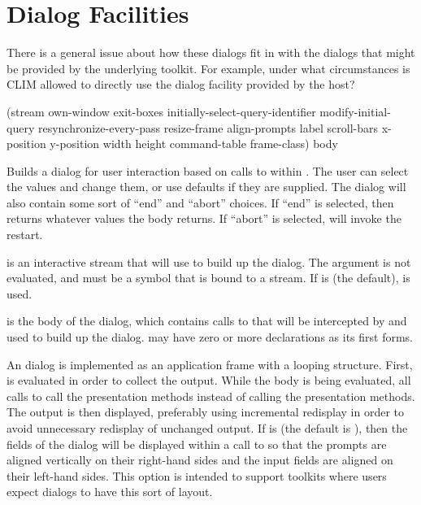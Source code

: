 
\chapter {Dialog Facilities}
\label {dialogs}

 {There is a general issue about how these dialogs fit in with the
dialogs that might be provided by the underlying toolkit.  For example, under
what circumstances is CLIM allowed to directly use the dialog facility provided
by the host?}


 {(\optional stream
                               \key own-window exit-boxes 
                                    initially-select-query-identifier modify-initial-query
                                    resynchronize-every-pass resize-frame
                                    align-prompts label scroll-bars 
                                    x-position y-position width height
                                    command-table frame-class)
                              \body body}

Builds a dialog for user interaction based on calls to  within
. The user can select the values and change them, or use defaults if
they are supplied.  The dialog will also contain some sort of ``end'' and
``abort'' choices.  If ``end'' is selected, then  returns
whatever values the body returns.  If ``abort'' is selected,
 will invoke the  restart.

 is an interactive stream that  will use to
build up the dialog.  The  argument is not evaluated, and must be a
symbol that is bound to a stream.  If  is  (the default),
 is used.

 is the body of the dialog, which contains calls to  that
will be intercepted by  and used to build up the dialog.
 may have zero or more declarations as its first forms.

An  dialog is implemented as an application frame with a
looping structure.  First,  is evaluated in order to collect the
output.  While the body is being evaluated, all calls to  call the
 presentation methods instead of calling the
 presentation methods.  The output is then displayed, preferably
using incremental redisplay in order to avoid unnecessary redisplay of unchanged
output.  If  is  (the default is ), then
the fields of the dialog will be displayed within a call to
 so that the prompts are aligned vertically on their
right-hand sides and the input fields are aligned on their left-hand sides.
This option is intended to support toolkits where users expect dialogs to have
this sort of layout.

